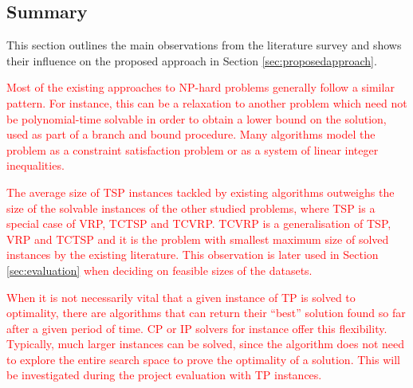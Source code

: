 \documentclass{mprop}
\theoremstyle{definition}
\begin{document}
\subsection{Summary}

This section outlines the main observations from the literature survey and shows their influence on the proposed approach in Section \ref{sec:proposedapproach}.

\textcolor{red}{
Most of the existing approaches to NP-hard problems generally follow a similar pattern. For instance, this can be a relaxation to another problem which need not be polynomial-time solvable in order to obtain a lower bound on the solution, used as part of a branch and bound procedure. Many algorithms model the problem as a constraint satisfaction problem or as a system of linear integer inequalities.} 

\textcolor{red}{
The average size of TSP instances tackled by existing algorithms outweighs the size of the solvable instances of the other studied problems, where TSP is a special case of VRP, TCTSP and TCVRP. TCVRP is a generalisation of TSP, VRP and TCTSP and it is the problem with smallest maximum size of solved instances by the existing literature. This observation is later used in Section \ref{sec:evaluation} when deciding on feasible sizes of the datasets.}

\textcolor{red}{When it is not necessarily vital that a given instance of TP is solved to optimality, there are algorithms that can return their ``best'' solution found so far after a given period of time. CP or IP solvers for instance offer this flexibility. Typically, much larger instances can be solved, since the algorithm does not need to explore the entire search space to prove the optimality of a solution. This will be investigated during the project evaluation with TP instances.}


\end{document}
